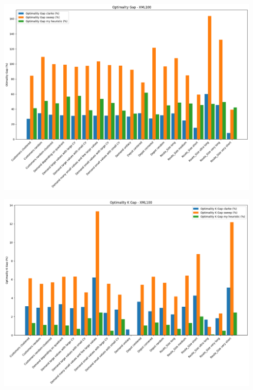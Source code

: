 \documentclass[compress]{beamer}
\begin{document}
\begin{frame}{\subsecname}
    \begin{center}
		\begin{minipage}{1\textwidth}
            \centering
            \includegraphics[width=0.8\linewidth]{images/xml100_gap.png}
        \end{minipage}
    \end{center}
\end{frame}

\begin{frame}{\subsecname}
    \begin{center}
		\begin{minipage}{1\textwidth}
            \centering
            \includegraphics[width=0.8\linewidth]{images/xml100_kgap.png}
        \end{minipage}
    \end{center}
\end{frame}
\end{document}
